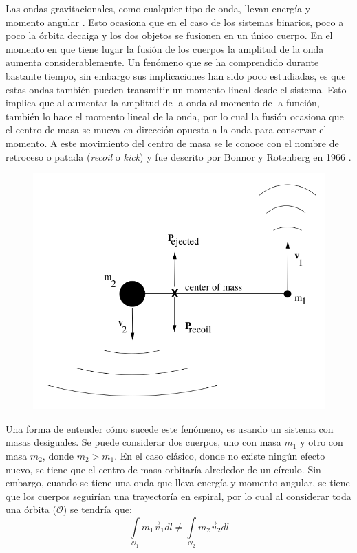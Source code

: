 	Las ondas gravitacionales, como cualquier tipo de onda, llevan energ\'ia y momento angular \cite{hughes2005black}. Esto ocasiona que en el caso de los sistemas binarios, poco a poco la \'orbita decaiga y los dos objetos se fusionen en un \'unico cuerpo. En el momento en que tiene lugar la fusi\'on de los cuerpos la amplitud de la onda aumenta considerablemente. Un fen\'omeno que se ha comprendido durante bastante tiempo, sin embargo sus implicaciones han sido poco estudiadas, es que estas ondas también pueden transmitir un momento lineal desde el sistema. Esto implica que al aumentar la amplitud de la onda al momento de la funci\'on, tambi\'en lo hace el momento lineal de la onda, por lo cual la fusi\'on ocasiona que
	el centro de masa se mueva en direcci\'on opuesta a la onda para conservar el momento. A este movimiento del centro de masa se le conoce con el nombre de retroceso o patada (\textit{recoil} o \textit{kick}) \cite{hughes2005black} y fue descrito por Bonnor y Rotenberg en 1966 \cite{bonnor1966gravitational}.
	\begin{figure}[h]
		\centering
		\includegraphics[width=0.6\linewidth]{Figures/binarySystem}
	\end{figure}
	
	Una forma de entender c\'omo sucede este fen\'omeno, es usando un sistema con masas desiguales. Se puede considerar dos cuerpos, uno con masa $m_1$ y otro con masa $m_2$, donde $m_2 > m_1$. En el caso cl\'asico, donde no existe ning\'un efecto nuevo, se tiene que el centro de masa orbitar\'ia alrededor de un c\'irculo. Sin embargo, cuando se tiene una onda que lleva energ\'ia y momento angular, se tiene que los cuerpos seguir\'ian una trayector\'ia en espiral, por lo cual al considerar toda una \'orbita ($\mathcal{O}$) se tendr\'ia que:
	\begin{equation}
		\int\limits_{\mathcal{O}_1} m_1\vec{v}_1dl \neq \int\limits_{\mathcal{O}_2} m_2\vec{v}_2dl 
	\end{equation}	
	
